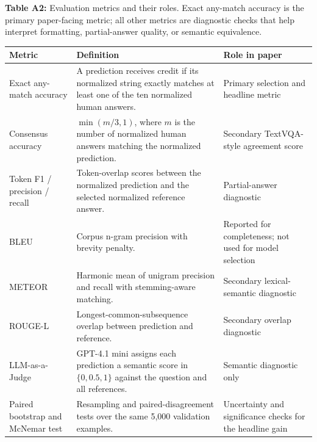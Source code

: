 \begin{center}
    \centering
    \scriptsize
    \setlength{\tabcolsep}{4pt}
    \raggedright
    \textbf{Table A2:} Evaluation metrics and their roles. Exact any-match accuracy is the primary paper-facing metric; all other metrics are diagnostic checks that help interpret formatting, partial-answer quality, or semantic equivalence.
    \par\smallskip
    \begin{tabular}{>{\raggedright\arraybackslash}p{}>{\raggedright\arraybackslash}p{}>{\raggedright\arraybackslash}p{}}
        \toprule
        Metric & Definition & Role in paper \\
        \midrule
        Exact any-match accuracy & A prediction receives credit if its normalized string exactly matches at least one of the ten normalized human answers. & Primary selection and headline metric \\
        Consensus accuracy & $\min(m/3, 1)$, where $m$ is the number of normalized human answers matching the normalized prediction. & Secondary TextVQA-style agreement score \\
        Token F1 / precision / recall & Token-overlap scores between the normalized prediction and the selected normalized reference answer. & Partial-answer diagnostic \\
        BLEU & Corpus n-gram precision with brevity penalty. & Reported for completeness; not used for model selection \\
        METEOR & Harmonic mean of unigram precision and recall with stemming-aware matching. & Secondary lexical-semantic diagnostic \\
        ROUGE-L & Longest-common-subsequence overlap between prediction and reference. & Secondary overlap diagnostic \\
        LLM-as-a-Judge & GPT-4.1 mini assigns each prediction a semantic score in $\{0, 0.5, 1\}$ against the question and all references. & Semantic diagnostic only \\
        Paired bootstrap and McNemar test & Resampling and paired-disagreement tests over the same 5,000 validation examples. & Uncertainty and significance checks for the headline gain \\
        \bottomrule
    \end{tabular}
\end{center}
